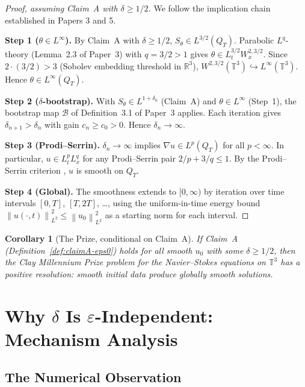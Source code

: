 \documentclass[11pt]{article}
\newtheorem{corollary}[theorem]{Corollary}
\theoremstyle{definition}
\theoremstyle{remark}
\newcommand{\R}{\mathbb{R}}
\newcommand{\T}{\mathbb{T}}
\newcommand{\norm}[1]{\left\|#1\right\|}
\newcommand{\grad}{\nabla}
\newcommand{\Sth}{S_\theta}
\newcommand{\dlt}{\delta}
\newcommand{\eps}{\varepsilon}
\begin{document}
\begin{proof}[Proof, assuming Claim~A with $\dlt\geq 1/2$]
  We follow the implication chain established in Papers 3 and 5.

  \textbf{Step 1 ($\theta\in L^\infty$).}
  By Claim~A with $\dlt\geq 1/2$, $\Sth\in L^{3/2}(Q_T)$.
  Parabolic $L^q$-theory (Lemma~2.3 of Paper~3) with $q=3/2>1$ gives
  $\theta\in L^{3/2}_t W^{2,3/2}_x$.  Since $2\cdot(3/2) > 3$ (Sobolev
  embedding threshold in $\R^3$), $W^{2,3/2}(\T^3)\hookrightarrow L^\infty(\T^3)$.
  Hence $\theta\in L^\infty(Q_T)$.

  \textbf{Step 2 ($\dlt$-bootstrap).}
  With $\Sth\in L^{1+\dlt_0}$ (Claim~A) and $\theta\in L^\infty$ (Step~1),
  the bootstrap map $\mathcal{B}$ of Definition~3.1 of Paper~3 applies.
  Each iteration gives $\dlt_{n+1}>\dlt_n$ with gain $c_n\geq c_0>0$.
  Hence $\dlt_n\to\infty$.

  \textbf{Step 3 (Prodi--Serrin).}
  $\dlt_n\to\infty$ implies $\grad u\in L^{p}(Q_T)$ for all $p<\infty$.
  In particular, $u\in L^p_t L^q_x$ for any Prodi--Serrin pair
  $2/p+3/q\leq 1$.  By the Prodi--Serrin criterion \cite{Prodi1959,Serrin1962},
  $u$ is smooth on $Q_T$.

  \textbf{Step 4 (Global).}
  The smoothness extends to $[0,\infty)$ by iteration over time intervals
  $[0,T]$, $[T,2T]$, \ldots, using the uniform-in-time energy bound
  $\norm{u(\cdot,t)}_{L^2}^2 \leq \norm{u_0}_{L^2}^2$ as a starting norm
  for each interval.
\end{proof}

\begin{corollary}[The Prize, conditional on Claim~A]\label{cor:prize}
  If Claim~A (Definition~\ref{def:claimA-eps0}) holds for all smooth $u_0$
  with some $\dlt\geq 1/2$, then the Clay Millennium Prize problem for the
  Navier--Stokes equations on $\T^3$ has a positive resolution:
  smooth initial data produce globally smooth solutions.
\end{corollary}

\section{Why $\dlt$ Is $\eps$-Independent: Mechanism Analysis}
\label{sec:delta-independence}

\subsection{The Numerical Observation}
\end{document}

